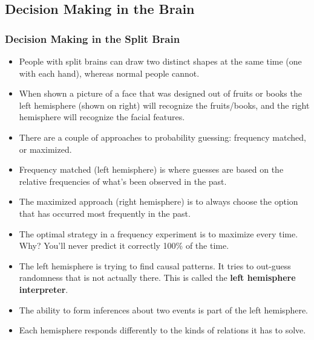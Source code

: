 \documentclass[]{article}
\newcommand{\lecture}[1]{\marginpar{{\footnotesize $\leftarrow$ \underline{#1}}}}
\begin{document}
		\subsection{Decision Making in the Brain} \lecture{March 28, 2013}
			\subsubsection{Decision Making in the Split Brain}
				\begin{itemize}
					\item People with split brains can draw two distinct shapes at the same time (one with each hand), whereas normal people cannot.
					\item When shown a picture of a face that was designed out of fruits or books the left hemisphere (shown on right) will recognize the fruits/books, and the right hemisphere will recognize the facial features.
					\item There are a couple of approaches to probability guessing: frequency matched, or maximized.
					\item Frequency matched (left hemisphere) is where guesses are based on the relative frequencies of what's been observed in the past.
					\item The maximized approach (right hemisphere) is to always choose the option that has occurred most frequently in the past.
					\item The optimal strategy in a frequency experiment is to maximize every time. Why? You'll never predict it correctly 100\% of the time.
					\item The left hemisphere is trying to find causal patterns. It tries to out-guess randomness that is not actually there. This is called the \textbf{left hemisphere interpreter}.
					\item The ability to form inferences about two events is part of the left hemisphere.
					\item Each hemisphere responds differently to the kinds of relations it has to solve.
				\end{itemize}
				
\end{document}
